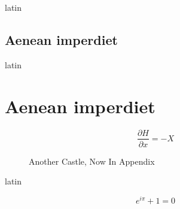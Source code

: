 \documentclass{fidata-report-template}
\begin{document}
\begin{otherlanguage*}{latin}

\section{Aenean imperdiet}

\lipsum[11]

\end{otherlanguage*}

\nocite{*}




\appendix

\begin{otherlanguage*}{latin}

\chapter{Aenean imperdiet}

\lipsum[12-16]

\begin{equation}
  \label{eq:C}
  \frac{\partial H}{\partial x} = -X
\end{equation}

\end{otherlanguage*}

\begin{figure}
  \centering
  \caption{Another Castle, Now In Appendix}
  \label{fig:castle1}
\end{figure}

\begin{otherlanguage*}{latin}

\lipsum[26]
\lipsum[32]

\end{otherlanguage*}

\begin{equation}
  \label{eq:D}
  e^{i\pi} + 1 = 0
\end{equation}
\end{document}
